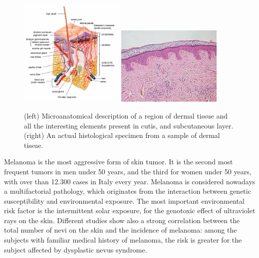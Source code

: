     \begin{figure}
        \centering
        \includegraphics[width = 0.45\textwidth]{images/derm_scheme}
        \includegraphics[width = 0.45\textwidth]{images/derm_specimen}

        \caption{(left) Microanatomical description of a region of dermal tissue and all the interesting elements present in cutis, and subcutaneous layer. (right) An actual histological specimen from a sample of dermal tissue.}
        \label{fig:derm_descr}
    \end{figure}

    Melanoma is the most aggressive form of skin tumor. It is the second most frequent tumors in men under 50 years, and the third for women under 50 years, with over than 12.300 cases in Italy every year. Melanoma is considered nowadays a multifactorial pathology, which originates from the interaction between genetic susceptibility and environmental exposure. The most important environmental risk factor is the intermittent solar exposure, for the genotoxic effect of ultraviolet rays on the skin. Different studies show also a strong correlation between the total number of nevi on the skin and the incidence of melanoma: among the subjects with familiar medical history of melanoma, the risk is greater for the subject affected by dysplastic nevus syndrome.

